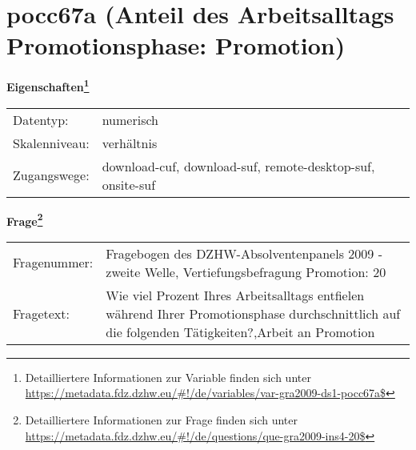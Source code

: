 
    \setcounter{footnote}{0}

    \vspace*{-1.8cm}
	\section{pocc67a (Anteil des Arbeitsalltags Promotionsphase: Promotion)}
	\label{section:pocc67a}



    \vspace*{0.5cm}
    \noindent\textbf{Eigenschaften\footnote{Detailliertere Informationen zur Variable finden sich unter
		\url{https://metadata.fdz.dzhw.eu/\#!/de/variables/var-gra2009-ds1-pocc67a$}}}\\
	\begin{tabularx}{\hsize}{@{}lX}
	Datentyp: & numerisch \\
	Skalenniveau: & verhältnis \\
	Zugangswege: &
	  download-cuf, 
	  download-suf, 
	  remote-desktop-suf, 
	  onsite-suf
 \\
    \end{tabularx}



				\vspace*{0.5cm}
                \noindent\textbf{Frage\footnote{Detailliertere Informationen zur Frage finden sich unter
		              \url{https://metadata.fdz.dzhw.eu/\#!/de/questions/que-gra2009-ins4-20$}}}\\
				\begin{tabularx}{\hsize}{@{}lX}
					Fragenummer: &
					  Fragebogen des DZHW-Absolventenpanels 2009 - zweite Welle, Vertiefungsbefragung Promotion:
					  20
 \\
					Fragetext: & Wie viel Prozent Ihres Arbeitsalltags entfielen während Ihrer Promotionsphase durchschnittlich auf die folgenden Tätigkeiten?,Arbeit an Promotion \\
				\end{tabularx}





